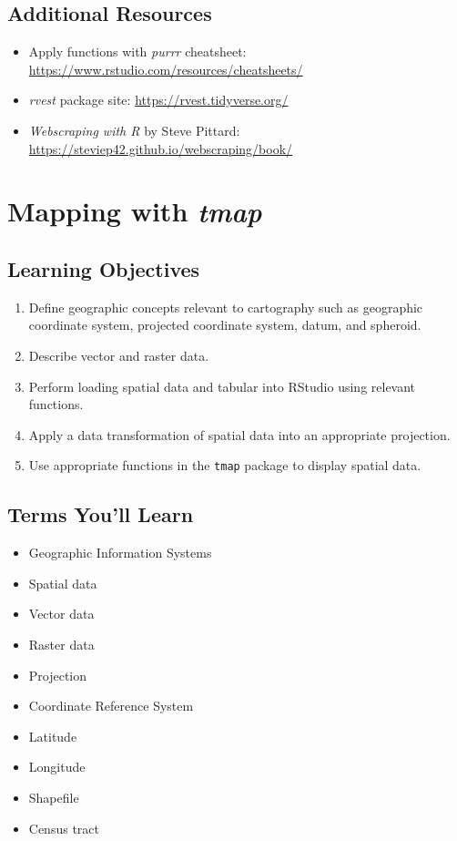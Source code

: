 \documentclass[
  krantz2]{krantz}
\providecommand{\tightlist}{%
  \setlength{\itemsep}{0pt}\setlength{\parskip}{0pt}}
\begin{document}
\hypertarget{rvest-resources}{%
\section{Additional Resources}\label{rvest-resources}}

\begin{itemize}
\tightlist
\item
  Apply functions with \emph{purrr} cheatsheet: \url{https://www.rstudio.com/resources/cheatsheets/}
\item
  \emph{rvest} package site: \url{https://rvest.tidyverse.org/}
\item
  \emph{Webscraping with R} by Steve Pittard: \url{https://steviep42.github.io/webscraping/book/}
\end{itemize}

\hypertarget{tmap}{%
\chapter{\texorpdfstring{Mapping with \emph{tmap}}{Mapping with tmap}}\label{tmap}}

\hypertarget{tmap-los}{%
\section{Learning Objectives}\label{tmap-los}}

\begin{enumerate}
\def\labelenumi{\arabic{enumi}.}
\tightlist
\item
  Define geographic concepts relevant to cartography such as geographic coordinate system, projected coordinate system, datum, and spheroid.
\item
  Describe vector and raster data.
\item
  Perform loading spatial data and tabular into RStudio using relevant functions.
\item
  Apply a data transformation of spatial data into an appropriate projection.
\item
  Use appropriate functions in the \texttt{tmap} package to display spatial data.
\end{enumerate}

\hypertarget{tmap-terms}{%
\section{Terms You'll Learn}\label{tmap-terms}}

\begin{itemize}
\tightlist
\item
  Geographic Information Systems
\item
  Spatial data
\item
  Vector data
\item
  Raster data
\item
  Projection
\item
  Coordinate Reference System
\item
  Latitude
\item
  Longitude
\item
  Shapefile
\item
  Census tract
\end{itemize}
\end{document}
